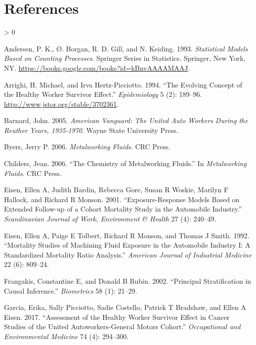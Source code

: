 \documentclass[
  11pt,
]{article}
\newlength{\cslhangindent}
\newenvironment{CSLReferences}[2] %
 {%
  \setlength{\parindent}{0pt}
  \ifodd #1 \everypar{\setlength{\hangindent}{\cslhangindent}}\ignorespaces\fi
  \ifnum #2 > 0
  \setlength{\parskip}{#2\baselineskip}
  \fi
 }%
 {}
\begin{document}
\newpage

\hypertarget{references}{%
\section*{References}\label{references}}

\hypertarget{refs}{}
\begin{CSLReferences}{1}{0}
\leavevmode\hypertarget{ref-Andersen_1993}{}%
Andersen, P. K., Ø. Borgan, R. D. Gill, and N. Keiding. 1993.
\emph{Statistical Models Based on Counting Processes}. Springer Series
in Statistics. Springer, New York, NY.
\url{https://books.google.com/books?id=kBnvAAAAMAAJ}.

\leavevmode\hypertarget{ref-Arrighi_1994}{}%
Arrighi, H. Michael, and Irva Hertz-Picciotto. 1994. {``The Evolving
Concept of the Healthy Worker Survivor Effect.''} \emph{Epidemiology} 5
(2): 189--96. \url{http://www.jstor.org/stable/3702361}.

\leavevmode\hypertarget{ref-Barnard_2005}{}%
Barnard, John. 2005. \emph{American Vanguard: The United Auto Workers
During the Reuther Years, 1935-1970}. Wayne State University Press.

\leavevmode\hypertarget{ref-Byers_2006}{}%
Byers, Jerry P. 2006. \emph{Metalworking Fluids}. CRC Press.

\leavevmode\hypertarget{ref-Childers_2006}{}%
Childers, Jean. 2006. {``The Chemistry of Metalworking Fluids.''} In
\emph{Metalworking Fluids}. CRC Press.

\leavevmode\hypertarget{ref-Eisen_2001}{}%
Eisen, Ellen A, Judith Bardin, Rebecca Gore, Susan R Woskie, Marilyn F
Hallock, and Richard R Monson. 2001. {``Exposure-Response Models Based
on Extended Follow-up of a Cohort Mortality Study in the Automobile
Industry.''} \emph{Scandinavian Journal of Work, Environment \& Health}
27 (4): 240--49.

\leavevmode\hypertarget{ref-Eisen_1992}{}%
Eisen, Ellen A, Paige E Tolbert, Richard R Monson, and Thomas J Smith.
1992. {``Mortality Studies of Machining Fluid Exposure in the Automobile
Industry {I}: A Standardized Mortality Ratio Analysis.''} \emph{American
Journal of Industrial Medicine} 22 (6): 809--24.

\leavevmode\hypertarget{ref-Frangakis_2002}{}%
Frangakis, Constantine E, and Donald B Rubin. 2002. {``Principal
Stratification in Causal Inference.''} \emph{Biometrics} 58 (1): 21--29.

\leavevmode\hypertarget{ref-Garcia_2017}{}%
Garcia, Erika, Sally Picciotto, Sadie Costello, Patrick T Bradshaw, and
Ellen A Eisen. 2017. {``Assessment of the Healthy Worker Survivor Effect
in Cancer Studies of the United Autoworkers-General Motors Cohort.''}
\emph{Occupational and Environmental Medicine} 74 (4): 294--300.


\end{CSLReferences}
\end{document}
